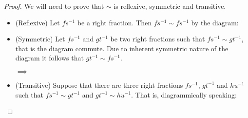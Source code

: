 \documentclass[11pt]{article}
\theoremstyle{definition}
\theoremstyle{remark}
\begin{document}
            \begin{proof}
                We will need to prove that $\sim$ is reflexive, symmetric and transitive.
                \begin{itemize}
                    \item (Reflexive) Let $fs^{-1}$ be a right fraction. Then $fs^{-1}\sim fs^{-1}$ by the diagram:
                    \begin{center}
                    \end{center}
                    \item (Symmetric) Let $fs^{-1}$ and $gt^{-1}$ be two right fractions such that $fs^{-1}\sim gt^{-1}$, that is the diagram commute. Due to inherent symmetric nature of the diagram it follows that $gt^{-1}\sim fs^{-1}$.
                    \begin{center}
                        $\implies$
                    \end{center}
                    \item (Transitive) Suppose that there are three right fractions $fs^{-1}$, $gt^{-1}$ and $hu^{-1}$ such that $fs^{-1}\sim gt^{-1}$ and $gt^{-1}\sim hu^{-1}$. That is, diagrammically speaking:
                    \begin{center}

\end{center}
\end{itemize}
\end{proof}
\end{document}
